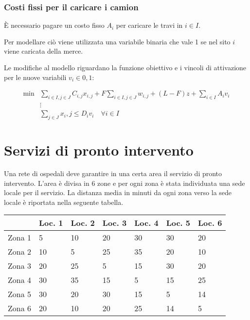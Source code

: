 \subsubsection{Costi fissi per il caricare i camion}

\`E necessario pagare un costo fisso $A_i$ per caricare le travi in $i \in I$.

Per modellare ciò viene utilizzata una variabile binaria che vale 1 se nel sito $i$ viene caricata della merce.

Le modifiche al modello riguardano la funzione obiettivo e i vincoli di attivazione per le nuove variabili $v_i \in {0,1}$:

\begin{align*}
\min &\sum\limits_{i \in I, j \in J} C_{i,j} x_{i,j} + F \sum\limits_{i \in I, j \in J} w_{i,j}+ (L-F)z +\sum\limits_{i \in I}A_i v_i \\
&\vdots \\
&\sum\limits_{j \in J} x_i,j \leq D_i v_i \quad\forall i \in I
\end{align*}

\section{Servizi di pronto intervento}

Una rete di ospedali deve garantire in una certa area il servizio di pronto intervento. L'area è divisa in 6 zone e per ogni zona è stata individuata una sede locale per il servizio. La distanza media in minuti da ogni zona verso la sede locale è riportata nella seguente tabella.

\begin{table}[htbp]
	\centering
	\begin{tabular}{|l|l|l|l|l|l|l|}
		\hline
		& Loc. 1 & Loc. 2 & Loc. 3 & Loc. 4 & Loc. 5 & Loc. 6 \\ \hline
		Zona 1 & 5 & 10 & 20 & 30 & 30 & 20 \\ \hline
		Zona 2 & 10 & 5 & 25 & 35 & 20 & 10 \\ \hline
		Zona 3 & 20 & 25 & 5 & 15 & 30 & 20 \\ \hline
		Zona 4 & 30 & 35 & 15 & 5 & 15 & 25 \\ \hline
		Zona 5 & 30 & 20 & 30 & 15 & 5 & 14 \\ \hline
		Zona 6 & 20 & 10 & 20 & 25 & 14 & 5 \\ \hline
	\end{tabular}
\end{table}

